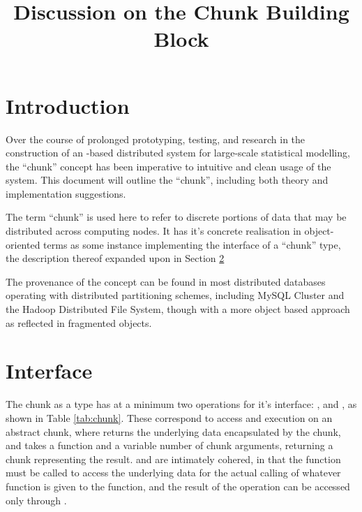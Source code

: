 \documentclass[10pt, a4paper]{article}
\begin{document}
\title{Discussion on the Chunk Building Block}
  
\maketitle

\section{Introduction} %

Over the course of prolonged prototyping, testing, and research in the construction of an \R{}-based distributed system for large-scale statistical modelling, the ``chunk'' concept has been imperative to intuitive and clean usage of the system.
This document will outline the ``chunk'', including both theory and implementation suggestions.

The term ``chunk'' is used here to refer to discrete portions of data that may be distributed across computing nodes.
It has it's concrete realisation in object-oriented terms as some instance implementing the interface of a ``chunk'' type, the description thereof expanded upon in Section \ref{int}

The provenance of the concept can be found in most distributed databases operating with distributed partitioning schemes, including MySQL Cluster and the Hadoop Distributed File System, though with a more object based approach as reflected in fragmented objects\cite{shvachko2010hadoop}\cite{kruckenberg2005mysql}.

\section{Interface}\label{int}

The chunk as a type has at a minimum two operations for it's interface: , and , as shown in Table \ref{tab:chunk}.
These correspond to access and execution on an abstract chunk, where  returns the underlying data encapsulated by the chunk, and  takes a function and a variable number of chunk arguments, returning a chunk representing the result.
 and  are intimately cohered, in that the  function must be called to access the underlying data for the actual calling of whatever function is given to the  function, and the result of the  operation can be accessed only through .
\end{document}
